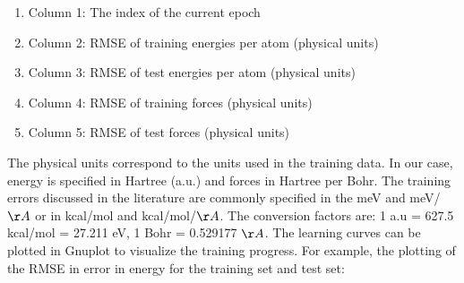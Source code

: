 \documentclass[12pt]{article}
\begin{document}
\begin{enumerate}
    \item Column 1: The index of the current epoch
    \item Column 2: RMSE of training energies per atom (physical units)
    \item Column 3: RMSE of test energies per atom (physical units)
    \item Column 4: RMSE of training forces (physical units)
    \item Column 5: RMSE of test forces (physical units)
\end{enumerate}

 The physical units correspond to the units used in the training data. In our case, energy is specified in Hartree (a.u.) and forces in Hartree per Bohr. The training errors discussed in the literature are commonly specified in the meV and meV/$\AA$ or in kcal/mol and kcal/mol/$\AA$. The conversion factors are: 1 a.u = 627.5 kcal/mol = 27.211 eV, 1 Bohr = 0.529177 $\AA$. The learning curves can be plotted in Gnuplot to visualize the training progress. For example, the plotting of the RMSE in error in energy for the training set and test set:

\begin{center}
\end{center}
\end{document}
